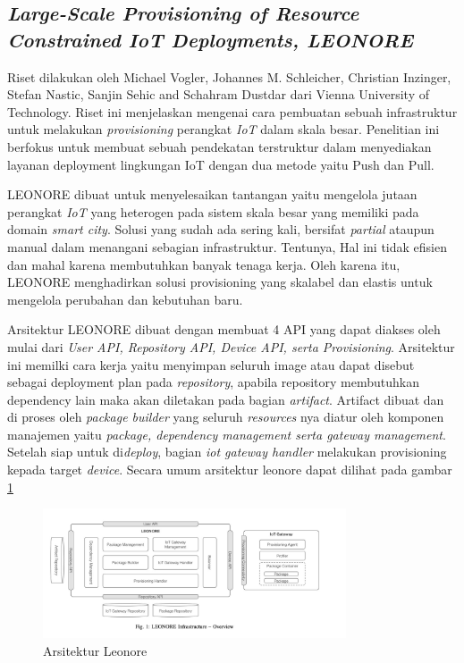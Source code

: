 \subsection{\textit{Large-Scale Provisioning of
    Resource Constrained
    IoT Deployments, LEONORE}}
\label{subsec:leonore}

Riset dilakukan oleh Michael Vogler, Johannes M. Schleicher, Christian Inzinger, Stefan Nastic, Sanjin Sehic and Schahram Dustdar dari Vienna University of Technology. Riset ini menjelaskan mengenai cara pembuatan sebuah infrastruktur untuk melakukan \textit{provisioning} perangkat \textit{IoT} dalam skala besar. Penelitian ini berfokus untuk membuat sebuah pendekatan terstruktur dalam menyediakan layanan deployment lingkungan IoT dengan dua metode yaitu Push dan Pull.

LEONORE dibuat untuk menyelesaikan tantangan yaitu mengelola jutaan perangkat \textit{IoT} yang heterogen pada sistem skala besar yang memiliki pada domain \textit{smart city}. Solusi yang sudah ada sering kali, bersifat \textit{partial} ataupun manual dalam menangani sebagian infrastruktur. Tentunya, Hal ini tidak efisien dan mahal karena membutuhkan banyak tenaga kerja. Oleh karena itu, LEONORE menghadirkan solusi provisioning yang skalabel dan elastis untuk mengelola perubahan dan kebutuhan baru.

Arsitektur LEONORE dibuat dengan membuat 4 API yang dapat diakses oleh mulai dari  \textit{User API, Repository API, Device API, serta Provisioning}. Arsitektur ini memilki cara kerja yaitu menyimpan seluruh image atau dapat disebut sebagai deployment plan pada \textit{repository}, apabila repository membutuhkan dependency lain maka akan diletakan pada bagian \textit{artifact}. Artifact dibuat dan di proses oleh \textit{package builder} yang seluruh \textit{resources} nya diatur oleh komponen manajemen yaitu \textit{package, dependency management serta gateway management}. Setelah siap untuk di\textit{deploy}, bagian \textit{iot gateway handler} melakukan provisioning kepada target \textit{device}. Secara umum arsitektur leonore dapat dilihat pada gambar \ref{fig:arsitektur-leonore}

\begin{figure}[ht]
  \centering
  \includegraphics[width=0.8\textwidth]{resources/chapter-2/arsitektur-leonore.jpg}
  \caption{Arsitektur Leonore \parencite{vogler2015leonore}}
  \label{fig:arsitektur-leonore}
\end{figure}

